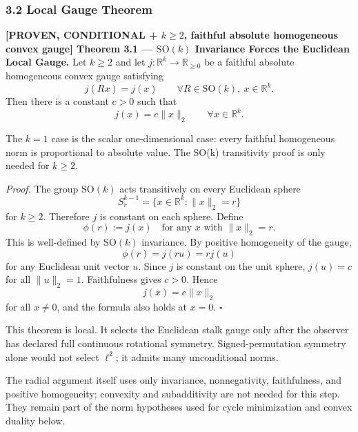 \documentclass[
  11pt,
]{article}
\begin{document}
\subsubsection{3.2 Local Gauge Theorem}\label{local-gauge-theorem}

\textbf{{[}PROVEN, CONDITIONAL + \(k\ge2\), faithful absolute
homogeneous convex gauge{]} Theorem 3.1 --- \(\mathrm{SO}(k)\)
Invariance Forces the Euclidean Local Gauge.} Let \(k\ge2\) and let
\(j:\mathbb R^k\to\mathbb R_{\ge0}\) be a faithful absolute homogeneous
convex gauge satisfying \[
j(Rx)=j(x)
\qquad
\forall R\in\mathrm{SO}(k),\ x\in\mathbb R^k.
\] Then there is a constant \(c>0\) such that \[
j(x)=c\|x\|_2
\qquad
\forall x\in\mathbb R^k.
\]

The \(k=1\) case is the scalar one-dimensional case: every faithful
homogeneous norm is proportional to absolute value. The SO(k)
transitivity proof is only needed for \(k \ge 2\).

\emph{Proof.} The group \(\mathrm{SO}(k)\) acts transitively on every
Euclidean sphere \[
S_r^{k-1}=\{x\in\mathbb R^k:\|x\|_2=r\}
\] for \(k\ge2\). Therefore \(j\) is constant on each sphere. Define \[
\phi(r):=j(x)
\quad\text{for any }x\text{ with }\|x\|_2=r.
\] This is well-defined by \(\mathrm{SO}(k)\) invariance. By positive
homogeneity of the gauge, \[
\phi(r)=j(ru)=rj(u)
\] for any Euclidean unit vector \(u\). Since \(j\) is constant on the
unit sphere, \(j(u)=c\) for all \(\|u\|_2=1\). Faithfulness gives
\(c>0\). Hence \[
j(x)=c\|x\|_2
\] for all \(x\ne0\), and the formula also holds at \(x=0\). \(\square\)

This theorem is local. It selects the Euclidean stalk gauge only after
the observer has declared full continuous rotational symmetry.
Signed-permutation symmetry alone would not select \(\ell^2\); it admits
many unconditional norms.

The radial argument itself uses only invariance, nonnegativity,
faithfulness, and positive homogeneity; convexity and subadditivity are
not needed for this step. They remain part of the norm hypotheses used
for cycle minimization and convex duality below.
\end{document}
